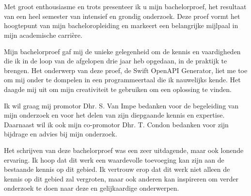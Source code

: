 
\chapter*{}%
\label{ch:voorwoord}

Met groot enthousiasme en trots presenteer ik u mijn bachelorproef, het resultaat van een heel semester van intensief en grondig onderzoek. Deze proef vormt het hoogtepunt van mijn bacheloropleiding en markeert een belangrijke mijlpaal in mijn academische carrière.

Mijn bachelorproef gaf mij de unieke gelegenheid om de kennis en vaardigheden die ik in de loop van de afgelopen drie jaar heb opgedaan, in de praktijk te brengen. Het onderwerp van deze proef, de Swift OpenAPI Generator, liet me toe om mij onder te dompelen in een programmeertaal die ik nauwelijks kende. Het daagde mij uit om mijn creativiteit te gebruiken om een oplossing te vinden. 

Ik wil graag mij promotor Dhr. S. Van Impe bedanken voor de begeleiding van mijn onderzoek en voor het delen van zijn diepgaande kennis en expertise. Daarnaast wil ik ook mijn co-promotor Dhr. T. Condon bedanken voor zijn bijdrage en advies bij mijn onderzoek. 

Het schrijven van deze bachelorproef was een zeer uitdagende, maar ook lonende ervaring. Ik hoop dat dit werk een waardevolle toevoeging kan zijn aan de bestaande kennis op dit gebied. Ik vertrouw erop dat dit werk niet alleen de kennis op dit gebied zal vergroten, maar ook anderen kan inspireren om verder onderzoek te doen naar deze en gelijkaardige onderwerpen.

